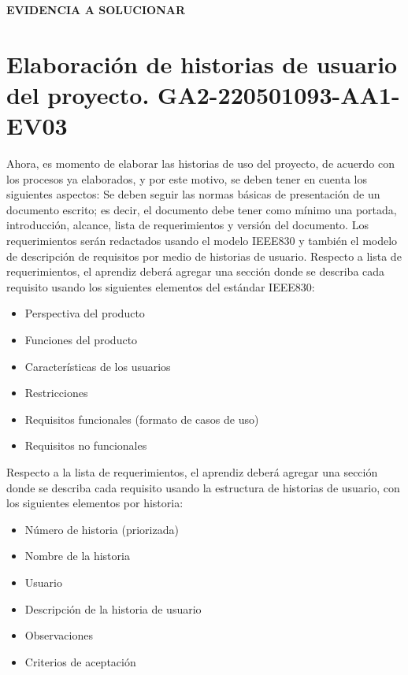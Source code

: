\documentclass{article}
\theoremstyle{mytheoremstyle}
\theoremstyle{mytheoremstyle}
\theoremstyle{myproblemstyle}
\begin{document}
\begin{flushleft}
    \large \textbf{EVIDENCIA A SOLUCIONAR}\\
    \vspace{0.1cm}
    \section*{Elaboración de historias de usuario del proyecto. GA2-220501093-AA1-EV03}
    
    Ahora, es momento de elaborar las historias de uso del proyecto, de acuerdo con los procesos ya elaborados, y por este motivo, se deben tener en cuenta los siguientes aspectos:
    \vspace{0.3cm}
    \newline Se deben seguir las normas básicas de presentación de un documento escrito; es decir, el documento debe tener como mínimo una portada, introducción, alcance, lista de requerimientos y versión del documento. Los requerimientos serán redactados usando el modelo IEEE830 y también el modelo de descripción de requisitos por medio de historias de usuario.
    \newline Respecto a lista de requerimientos, el aprendiz deberá agregar una sección donde se describa cada requisito usando los siguientes elementos del estándar IEEE830:
\begin{itemize}
    \item Perspectiva del producto
    \item Funciones del producto
    \item Características de los usuarios
    \item Restricciones
    \item Requisitos funcionales (formato de casos de uso)
    \item Requisitos no funcionales
\end{itemize}   
Respecto a la lista de requerimientos, el aprendiz deberá agregar una sección donde se describa cada requisito usando la estructura de historias de usuario, con los siguientes elementos por historia: 
\begin{itemize}
    \item Número de historia (priorizada)
    \item Nombre de la historia
    \item Usuario
    \item Descripción de la historia de usuario
    \item Observaciones
    \item Criterios de aceptación
\end{itemize}    
    \end{flushleft}
    \newpage
    \tableofcontents
    \newpage
\end{document}

